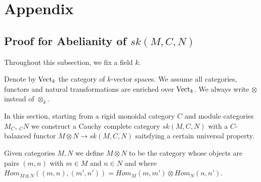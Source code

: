 %


\appendix
\section{Appendix}

\subsection{Proof for Abelianity of $sk(M,C,N)$}

Throughout this subsection, we fix a field $k$.

\begin{definition}

Denote by $\operatorname{Vect}_k$ the category of $k$-vector spaces. We assume all categories, functors and natural transformations are enriched over $\operatorname{Vect}_k$. We always write $\otimes$ instead of $\otimes_k$.\end{definition}

In this section, starting from a rigid monoidal category $C$ and module categories $M_C$, $_{C}N$  we construct a Cauchy complete category $sk(M,C,N)$ with a $C$-balanced functor $M\otimes N\to sk(M,C,N)$ saitsfying a certain universal property.

\begin{definition}

Given categories $M, N$ we define $M\otimes N$ to be the category whose objects are pairs $(m,n)$ with $m\in M$ and $n\in N$ and where $Hom_{M\otimes N}((m,n),(m',n'))=Hom_{M}(m,m')\otimes Hom_N(n,n')$.

\end{definition}


